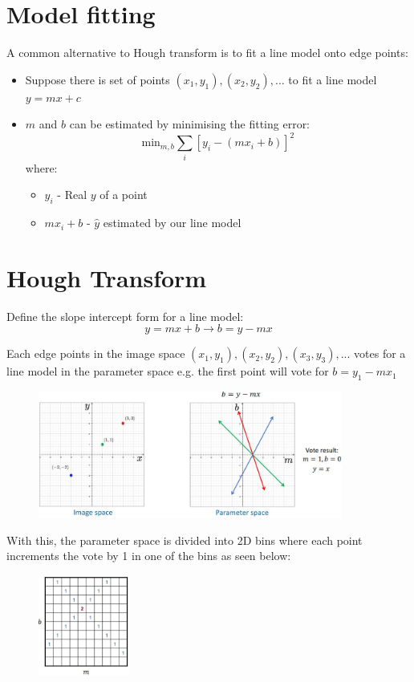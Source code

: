 \documentclass{report}
\begin{document}
\section{Model fitting}

A common alternative to Hough transform is to fit a line model onto edge points:
\begin{itemize}
    \item Suppose there is set of points $(x_1, y_1), (x_2, y_2), \dots$ to fit
    a line model $y = mx + c$
    \item $m$ and $b$ can be estimated by minimising the fitting error: 
    $$
        \text{min}_{m,b} \sum_i [y_i - (mx_i + b)]^2
    $$
    where:
    \begin{itemize}
        \item $y_i$ - Real $y$ of a point 
        \item $mx_i + b$ - $\hat{y}$ estimated by our line model 
    \end{itemize}
\end{itemize}

\pagebreak

\section{Hough Transform}

Define the slope intercept form for a line model:
$$
    y = mx + b \rightarrow b = y - mx
$$

Each edge points in the image space $(x_1, y_1), (x_2, y_2), (x_3, y_3), ...$
votes for a line model in the parameter space e.g. the first point will vote
for $b = y_1 - mx_1$
\begin{figure}[h]
    \centering
    \includegraphics[width=10cm]{Hough transform.JPG}
\end{figure}

With this, the parameter space is divided into 2D bins where each point
increments the vote by 1 in one of the bins as seen below:
\begin{figure}[h]
    \centering
    \includegraphics[width=3cm]{Hough bins.JPG}
\end{figure}
\end{document}
